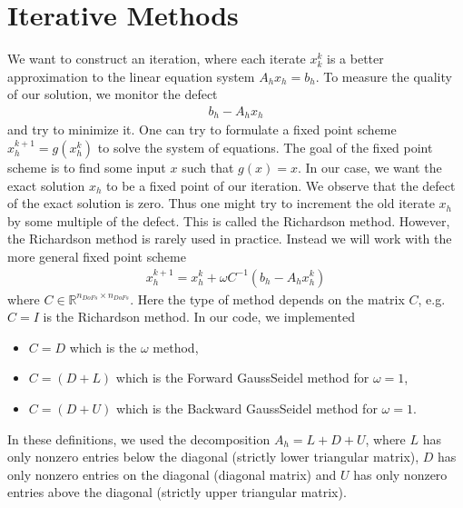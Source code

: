\documentclass[letterpaper,10pt,english, openany]{sphinxmanual}
\begin{document}
\section{Iterative Methods}
\label{\detokenize{basics:iterative-methods}}
We want to construct an iteration, where each iterate \(x_k^{k}\) is a better approximation to the linear equation system \(A_h x_h = b_h\).
To measure the quality of our solution, we monitor the {\color{blue}defect}
\begin{equation*}
\begin{split}b_h - A_h x_h\end{split}
\end{equation*}
and try to minimize it.
One can try to formulate a fixed point scheme \(x_h^{k+1} = g\left(x_h^{k}\right)\) to solve the system of equations.
The goal of the fixed point scheme is to find some input \(x\) such that \(g(x) = x\).
In our case, we want the exact solution \(x_h\) to be a fixed point of our iteration.
We observe that the defect of the exact solution is zero. Thus one might try to increment the old iterate \(x_h\)
by some multiple of the defect. This is called the Richardson method. However, the Richardson method is rarely used in practice.
Instead we will work with the more general fixed point scheme
\begin{equation*}
\begin{split}x_h^{k+1} = x_h^{k} + \omega C^{-1}\left(b_h - A_h x_h^{k} \right)\end{split}
\end{equation*}
where \(C \in \mathbb{R}^{n_{DoFs} \times n_{DoFs}}\). Here the type of method depends on the matrix \(C\), e.g.
\(C = I\) is the Richardson method. In our code, we implemented
\begin{itemize}
\item {} 
\(C = D\) which is the \(\omega\) method,

\item {} 
\(C = \left( D + L \right)\) which is the  {\color{blue}Forward Gauss\sphinxhyphen{}Seidel} method for \(\omega = 1\),

\item {} 
\(C = \left( D + U \right)\) which is the  {\color{blue}Backward Gauss\sphinxhyphen{}Seidel} method for \(\omega = 1\).

\end{itemize}

In these definitions, we used the decomposition  \(A_h = L + D + U\), where \(L\) has only nonzero entries below the diagonal (strictly lower triangular matrix),
\(D\) has only nonzero entries on the diagonal (diagonal matrix) and \(U\) has only nonzero entries above the diagonal (strictly upper triangular matrix).
\end{document}
